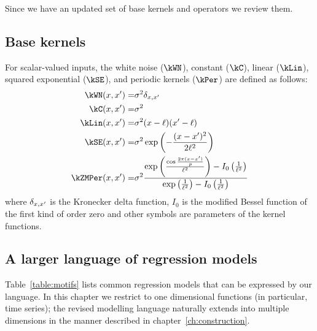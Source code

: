 Since we have an updated set of base kernels and operators we review them.

\subsection{Base kernels}
\label{sec:description:base}

For scalar-valued inputs, the white noise ($\kWN$), constant ($\kC$), linear ($\kLin$), squared exponential ($\kSE$), and periodic kernels ($\kPer$) are defined as follows:
\begin{eqnarray}
\kWN(\inputVar, \inputVar') =& \sigma^2\delta_{\inputVar, \inputVar'} \\
\kC(\inputVar, \inputVar') =& \sigma^2 \\
\kLin(\inputVar, \inputVar') =& \sigma^2(\inputVar - \ell)(\inputVar' - \ell) \\
\kSE(\inputVar, \inputVar') =& \sigma^2\exp\left(-\frac{(\inputVar - \inputVar')^2}{2\ell^2}\right) \\
\kZMPer(\inputVar, \inputVar') =&  \sigma^2\frac{\exp\left(\frac{\cos\frac{2 \pi (\inputVar - \inputVar')}{p}}{\ell^2}\right) - I_0\left(\frac{1}{\ell^2}\right)}{\exp\left(\frac{1}{\ell^2}\right) - I_0\left(\frac{1}{\ell^2}\right)}
\end{eqnarray}
where $\delta_{x, x'}$ is the Kronecker delta function, $I_0$ is the modified Bessel function of the first kind of order zero and other symbols are parameters of the kernel functions.

\subsection{A larger language of regression models}

Table~\ref{table:motifs} lists common regression models that can be expressed by our language.
In this chapter we restrict to one dimensional functions (in particular, time series); the revised modelling language naturally extends into multiple dimensions in the manner described in chapter~\ref{ch:construction}.


